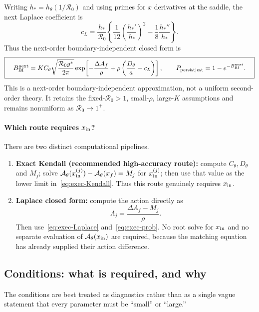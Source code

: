 \documentclass[11pt,a4paper]{article}
\newcommand{\Rzero}{\mathcal R_0}
\newcommand{\Afun}{\mathcal A_\theta}
\newcommand{\xf}{x_f}
\begin{document}
Writing $h_*=h_\theta(1/\Rzero)$ and using primes for $x$ derivatives at the
saddle, the next Laplace coefficient is
\begin{equation}
 c_L=\frac{h_*}{\Rzero}\left\{
 \frac1{12}\left(\frac{h_*'}{h_*}\right)^2
 -\frac18\frac{h_*''}{h_*}\right\}.
 \label{eq:exec-cL}
\end{equation}
Thus the next-order boundary-independent closed form is
\begin{equation}
 \boxed{\quad B_{\rm BI}^{\rm next}=K C_\theta
 \sqrt{\frac{\Rzero y^*}{2\pi}}
 \exp\!\left[-\frac{\Delta A_f}{\rho}
 +\rho\left(\frac{D_\theta}{a}-c_L\right)\right],\qquad
 P_{\rm persist\mid est}=1-e^{-B_{\rm BI}^{\rm next}}.\quad}
 \label{eq:exec-BI-next}
\end{equation}
This is a next-order boundary-independent approximation, not a uniform
second-order theory.  It retains the fixed-$\Rzero>1$, small-$\rho$, large-$K$
assumptions and remains nonuniform as $\Rzero\to1^+$.

\paragraph{Which route requires $x_{\rm in}$?}
There are two distinct computational pipelines.
\begin{enumerate}
 \item \textbf{Exact Kendall (recommended high-accuracy route):}
 compute $C_\theta,D_\theta$ and $M_j$; solve
 $\Afun(x_{\rm in}^{(j)})-\Afun(\xf)=M_j$ for $x_{\rm in}^{(j)}$; then use
 that value as the lower limit in~\eqref{eq:exec-Kendall}.  Thus this route
 genuinely requires $x_{\rm in}$.
 \item \textbf{Laplace closed form:} compute the action directly as
 \[
 \Lambda_j=\frac{\Delta A_f-M_j}{\rho}.
 \]
 Then use~\eqref{eq:exec-Laplace} and~\eqref{eq:exec-prob}.  No root solve for
 $x_{\rm in}$ and no separate evaluation of $\Afun(x_{\rm in})$ are required,
 because the matching equation has already supplied their action difference.
\end{enumerate}

\subsection{Conditions: what is required, and why}

The conditions are best treated as diagnostics rather than as a single vague
statement that every parameter must be ``small'' or ``large.''
\end{document}

